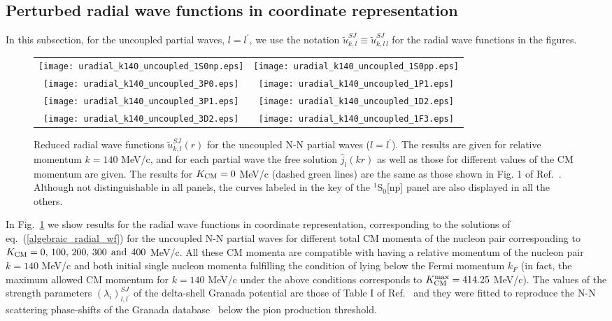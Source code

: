 \documentclass[aps,twocolumn,showpacs,preprintnumbers,amsmath,amssymb,nofootinbib,superscriptaddress,showkeys,noeprint]{revtex4-1}
\begin{document}
\subsection{Perturbed radial wave functions in coordinate 
representation}\label{subsec:perturbed_radial_wf_coordinates}

In this subsection, for the uncoupled partial waves, $l=l^\prime$, we
use the notation $\widetilde{u}^{SJ}_{k,l}\equiv
\widetilde{u}^{SJ}_{k,l\,l}$ for the radial wave functions in the
figures.

\begin{figure*}[!ht]
\begin{tabular}{cc}
\texttt{[image: uradial\_k140\_uncoupled\_1S0np.eps]}&
\texttt{[image: uradial\_k140\_uncoupled\_1S0pp.eps]}\\
\texttt{[image: uradial\_k140\_uncoupled\_3P0.eps]}&
\texttt{[image: uradial\_k140\_uncoupled\_1P1.eps]}\\
\texttt{[image: uradial\_k140\_uncoupled\_3P1.eps]}&
\texttt{[image: uradial\_k140\_uncoupled\_1D2.eps]}\\
\texttt{[image: uradial\_k140\_uncoupled\_3D2.eps]}&
\texttt{[image: uradial\_k140\_uncoupled\_1F3.eps]}
\end{tabular}
\caption{Reduced radial wave functions $\widetilde{u}^{SJ}_{k,l}(r)$
  for the uncoupled N-N partial waves ($l=l^\prime$). The results are
  given for relative momentum $k=140$ MeV/c, and for each partial wave
  the free solution $\hat{j}_l(kr)$ as well as those for different
  values of the CM momentum are given. The results for $K_{\rm CM}=0$
  MeV/c (dashed green lines) are the same as those shown in Fig. 1 of
  Ref.~\cite{RuizSimo:2017tcb}. Although not distinguishable in all
  panels, the curves labeled in the key of the ${}^{1}$S$_0$[np]
  panel are also displayed in all the others. }
\label{Fig:uradial}
\end{figure*}

In Fig.~\ref{Fig:uradial} we show results for the radial wave
functions in coordinate representation, corresponding to the solutions
of eq.~(\ref{algebraic_radial_wf}) for the uncoupled N-N partial waves
for different total CM momenta of the nucleon pair corresponding to
$K_{\rm CM}=0,\, 100,\, 200,\, 300 \; \, {\rm and}\; \, 400$
MeV/c. All these CM momenta are compatible with having a relative
momentum of the nucleon pair $k=140$ MeV/c and both initial single
nucleon momenta fulfilling the condition of lying below the Fermi
momentum $k_F$ (in fact, the maximum allowed CM momentum for $k=140$
MeV/c under the above conditions corresponds to $K^{\rm max}_{\rm CM}
= 414.25$ MeV/c).  The values of the strength parameters
$\left(\lambda_i \right)^{SJ}_{l,l^\prime}$ of the delta-shell Granada
potential are those of Table I of Ref.~\cite{Perez:2013mwa} and they
were fitted to reproduce the N-N scattering phase-shifts of the
Granada database~\cite{NNdatabase} below the pion production
threshold.
\end{document}
